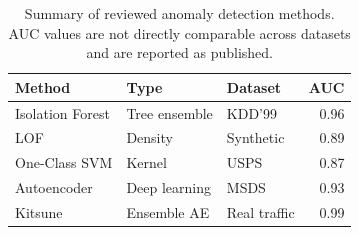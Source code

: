 \begin{table}[ht]
  \centering
  \caption{Summary of reviewed anomaly detection methods. AUC values are not directly comparable across datasets and are reported as published.}
  \label{tab:sota}
  \footnotesize
  \begin{tabular}{lllr}
    \toprule
    \textbf{Method}      & \textbf{Type}       & \textbf{Dataset}    & \textbf{AUC} \\
    \midrule
    Isolation Forest \cite{liu2008isolation}    & Tree ensemble & KDD'99        & 0.96 \\
    LOF \cite{breunig2000lof}                   & Density       & Synthetic     & 0.89 \\
    One-Class SVM \cite{scholkopf2001ocsvm}     & Kernel        & USPS          & 0.87 \\
    Autoencoder \cite{sakurada2014autoencoder}  & Deep learning & MSDS          & 0.93 \\
    Kitsune \cite{mirsky2018kitsune}            & Ensemble AE   & Real traffic  & 0.99 \\
    \bottomrule
  \end{tabular}
\end{table}

